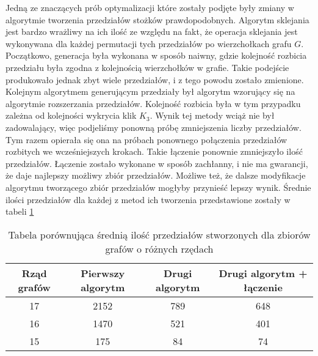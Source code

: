 Jedną ze znaczących prób optymalizacji które zostały podjęte były zmiany w algorytmie tworzenia przedziałów stożków prawdopodobnych. Algorytm sklejania jest bardzo wrażliwy na ich ilość ze względu na fakt, że operacja sklejania jest wykonywana dla każdej permutacji tych przedziałów po wierzchołkach grafu $G$. Początkowo, generacja była wykonana w sposób naiwny, gdzie kolejność rozbicia przedziału była zgodna z kolejnością wierzchołków w grafie. Takie podejście produkowało jednak zbyt wiele przedziałów, i z tego powodu zostało zmienione. Kolejnym algorytmem generującym przedziały był algorytm wzorujący się na algorytmie rozszerzania przedziałów. Kolejność rozbicia była w tym przypadku zależna od kolejności wykrycia klik $K_3$. Wynik tej metody wciąż nie był zadowalający, więc podjeliśmy ponowną próbę zmniejszenia liczby przedziałów. Tym razem opierała się ona na próbach ponownego połączenia przedziałów rozbitych we wcześniejszych krokach. Takie łączenie ponownie zmniejszyło ilość przedziałów. Łączenie zostało wykonane w sposób zachłanny, i nie ma gwarancji, że daje najlepszy możliwy zbiór przedziałów. Możliwe też, że dalsze modyfikacje algorytmu tworzącego zbiór przedziałów mogłyby przynieść lepszy wynik. Średnie ilości przedziałów dla każdej z metod ich tworzenia przedstawione zostały w tabeli \ref{tabPrzedzialy}

 \begin{table}[H]
 \begin{center}
 \begin{tabular}{|c c c c|} 
 \hline
 Rząd grafów & Pierwszy algorytm & Drugi algorytm & Drugi algorytm + łączenie \\ 
 \hline\hline
 17 & 2152 &  789 & 648\\
 \hline
 16 & 1470 & 521 & 401\\
 \hline
 15 & 175 & 84 & 74\\
 \hline
\end{tabular}
\end{center}
 \caption{Tabela porównująca średnią ilość przedziałów stworzonych dla zbiorów grafów o różnych rzędach}
 \label{tabPrzedzialy}
 \end{table}